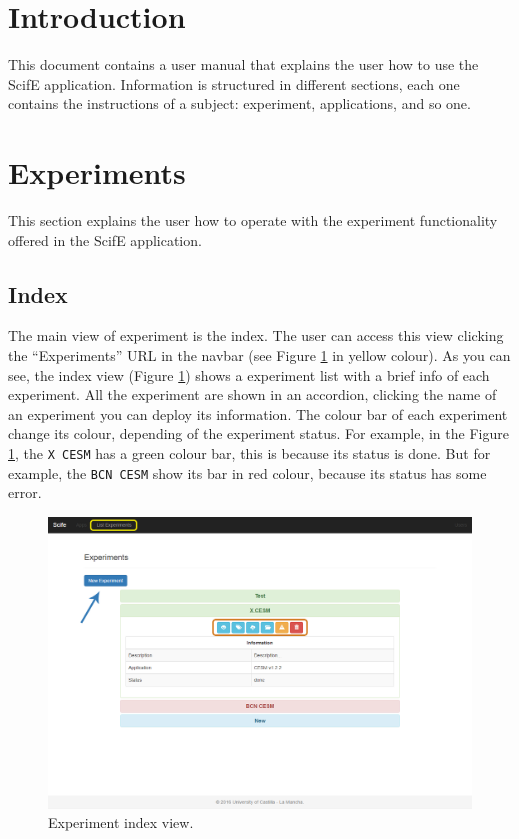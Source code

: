 \documentclass[11pt]{article}
\begin{document}
\newpage
\thispagestyle{empty}
\tableofcontents
\clearpage
\thispagestyle{empty}
\listoffigures
\clearpage
\setcounter{page}{1}

\section{Introduction}
This document contains a user manual that explains the user how to use the ScifE application. Information is structured in different sections, each one contains the instructions of a subject: experiment, applications, and so one.

\section{Experiments}
This section explains the user how to operate with the experiment functionality offered in the ScifE application.

\subsection{Index}
The main view of experiment is the index. The user can access this view clicking the ``Experiments'' URL in the navbar (see Figure \ref{fig:index} in yellow colour). As you can see, the index view (Figure \ref{fig:index}) shows a experiment list with a brief info of each experiment. All the experiment are shown in an accordion, clicking the name of an experiment you can deploy its information. The colour bar of each experiment change its colour, depending of the experiment status. For example, in the Figure \ref{fig:index}, the \texttt{X CESM} has a green colour bar, this is because its status is done. But for example, the \texttt{BCN CESM} show its bar in red colour, because its status has some error.\\
\begin{figure}[htp]
	\centering
	\includegraphics[width=\linewidth]{index}
	\caption{Experiment index view.}
	\label{fig:index}
\end{figure}
\end{document}
